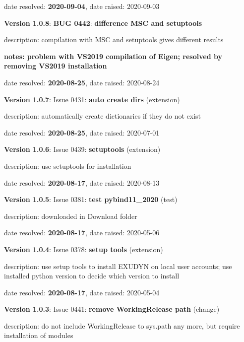   \item   date resolved: {\bf 2020-09-04},
date raised: 2020-09-03   \ei
  \item {\bf Version 1.0.8}: \vspace{-6pt} 
{\bf \color{warningRed}  BUG 0442}: {\bf difference MSC and setuptools}
  \bi
  \item {\small description: compilation with MSC and setuptools gives different results}
  \item {\small \bf notes: problem with VS2019 compilation of Eigen; resolved by removing VS2019 installation}
  \item   date resolved: {\bf 2020-08-25},
date raised: 2020-08-24   \ei
  \item {\bf Version 1.0.7}: \vspace{-6pt} 
  Issue 0431: {\bf auto create dirs}
(extension)
  \bi
  \item {\small description: automatically create dictionaries if they do not exist}
  \item   date resolved: {\bf 2020-08-25},
date raised: 2020-07-01   \ei
  \item {\bf Version 1.0.6}: \vspace{-6pt} 
  Issue 0439: {\bf setuptools}
(extension)
  \bi
  \item {\small description: use setuptools for installation}
  \item   date resolved: {\bf 2020-08-17},
date raised: 2020-08-13   \ei
  \item {\bf Version 1.0.5}: \vspace{-6pt} 
  Issue 0381: {\bf test pybind11\_2020}
(test)
  \bi
  \item {\small description: downloaded in Download folder}
  \item   date resolved: {\bf 2020-08-17},
date raised: 2020-05-06   \ei
  \item {\bf Version 1.0.4}: \vspace{-6pt} 
  Issue 0378: {\bf setup tools}
(extension)
  \bi
  \item {\small description: use setup tools to install EXUDYN on local user accounts; use installed python version to decide which version to install}
  \item   date resolved: {\bf 2020-08-17},
date raised: 2020-05-04   \ei
  \item {\bf Version 1.0.3}: \vspace{-6pt} 
  Issue 0441: {\bf remove WorkingRelease path}
(change)
  \bi
  \item {\small description: do not include WorkingRelease to sys.path any more, but require installation of modules}
